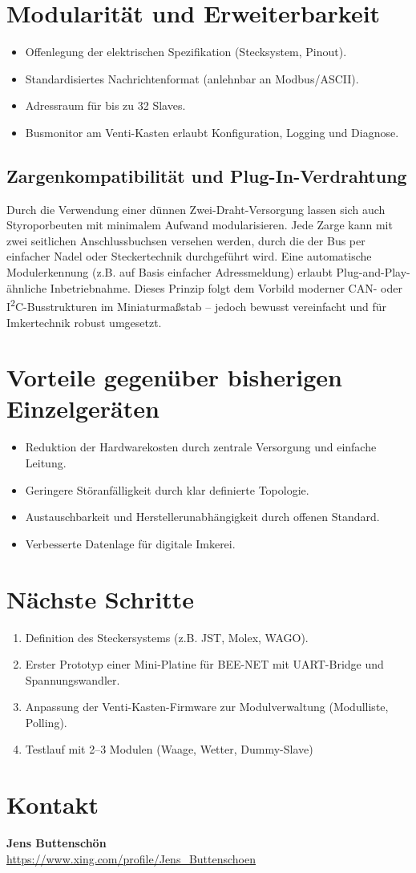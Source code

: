 \documentclass[11pt,a4paper]{article}
\begin{document}
\section{Modularit\"at und Erweiterbarkeit}
\begin{itemize}
  \item Offenlegung der elektrischen Spezifikation (Stecksystem, Pinout).
  \item Standardisiertes Nachrichtenformat (anlehnbar an Modbus/ASCII).
  \item Adressraum f\"ur bis zu 32 Slaves.
  \item Busmonitor am Venti-Kasten erlaubt Konfiguration, Logging und Diagnose.
\end{itemize}

\subsection*{Zargenkompatibilit\"at und Plug-In-Verdrahtung}
Durch die Verwendung einer d\"unnen Zwei-Draht-Versorgung lassen sich auch Styroporbeuten mit minimalem Aufwand modularisieren. Jede Zarge kann mit zwei seitlichen Anschlussbuchsen versehen werden, durch die der Bus per einfacher Nadel oder Steckertechnik durchgef\"uhrt wird. Eine automatische Modulerkennung (z.B. auf Basis einfacher Adressmeldung) erlaubt Plug-and-Play-\"ahnliche Inbetriebnahme. Dieses Prinzip folgt dem Vorbild moderner CAN- oder I\textsuperscript{2}C-Busstrukturen im Miniaturma\ss stab -- jedoch bewusst vereinfacht und f\"ur Imkertechnik robust umgesetzt.

\section{Vorteile gegen\"uber bisherigen Einzelger\"aten}
\begin{itemize}
  \item Reduktion der Hardwarekosten durch zentrale Versorgung und einfache Leitung.
  \item Geringere St\"oranf\"alligkeit durch klar definierte Topologie.
  \item Austauschbarkeit und Herstellerunabh\"angigkeit durch offenen Standard.
  \item Verbesserte Datenlage f\"ur digitale Imkerei.
\end{itemize}

\section*{N\"achste Schritte}
\begin{enumerate}[topsep=2pt]
  \item Definition des Steckersystems (z.B. JST, Molex, WAGO).
  \item Erster Prototyp einer Mini-Platine f\"ur BEE-NET mit UART-Bridge und Spannungswandler.
  \item Anpassung der Venti-Kasten-Firmware zur Modulverwaltung (Modulliste, Polling).
  \item Testlauf mit 2--3 Modulen (Waage, Wetter, Dummy-Slave)
\end{enumerate}

\section*{Kontakt}
\textbf{Jens Buttensch\"on}\\
\small{\url{https://www.xing.com/profile/Jens_Buttenschoen}}
\end{document}
